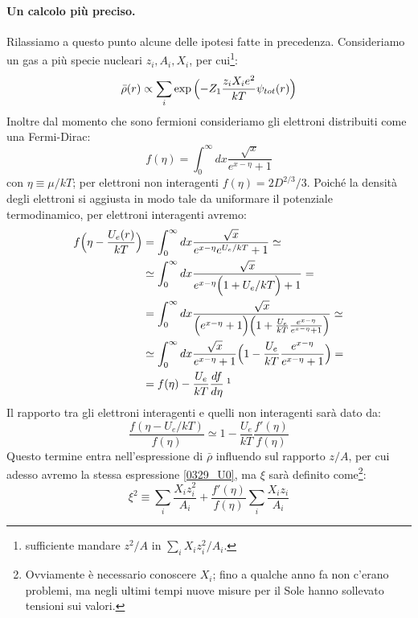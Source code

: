 \paragraph{Un calcolo più preciso.}Rilassiamo a questo punto alcune delle ipotesi fatte in precedenza. Consideriamo un gas a più specie nucleari $z_i, A_i, X_i$, per cui\footnote{ sufficiente mandare $z^2/A$ in $\sum_i X_iz^2_i/A_i$.}:
$$\bar{\rho}(r)\propto \sum_i \exp{\Bigl ( -Z_1 \frac{z_iX_i e^2}{kT}\psi_{tot}(r) \Bigr )}$$
Inoltre dal momento che sono fermioni consideriamo gli elettroni distribuiti come una Fermi-Dirac:
$$f(\eta) = \int_0^\infty dx \frac{\sqrt{x}}{e^{x-\eta}+1}$$
con $\eta \equiv \mu/kT$; per elettroni non interagenti $f(\eta) = 2D^{2/3}/3$. Poiché la densità degli elettroni si aggiusta in modo tale da uniformare il potenziale termodinamico, per elettroni interagenti avremo:
\begin{displaymath}
\begin{aligned}
f\ppc{\eta - \frac{U_e(r)}{kT}} &= \int_0^\infty dx \frac{\sqrt{x}}{e^{x-\eta}e^{U_e/kT}+1} \simeq \\
&\simeq \int_0^\infty dx \frac{\sqrt{x}}{e^{x-\eta}\ppc{1+U_e/kT}+1} =\\
&= \int_0^\infty dx \frac{\sqrt{x}}{\ppc{e^{x-\eta}+1}\ppc{1+\frac{U_e}{kT}\frac{e^{x-\eta}}{e^{x-\eta}+1}}}\simeq \\
&\simeq \int_0^\infty dx \frac{\sqrt{x}}{e^{x-\eta}+1}\ppc{1-\frac{U_e}{kT}\frac{e^{x-\eta}}{e^{x-\eta}+1}} =\\
&= f(\eta) - \frac{U_e}{kT}\frac{df}{d\eta}\:\footnotemark
\end{aligned}
\end{displaymath}
\noindent Il rapporto tra gli elettroni interagenti e quelli non interagenti sarà dato da:
$$\frac{f(\eta-U_e/kT)}{f(\eta)} \simeq 1- \frac{U_e}{kT}\frac{f'(\eta)}{f(\eta)}$$
Questo termine entra nell'espressione di $\bar{\rho}$ influendo sul rapporto $z/A$, per cui adesso avremo la stessa espressione \eqref{0329_U0}, ma $\xi$ sarà definito come\footnote{Ovviamente è necessario conoscere $X_i$; fino a qualche anno fa non c'erano problemi, ma negli ultimi tempi nuove misure per il Sole hanno sollevato tensioni sui valori.}:
$$\xi^2 \equiv \sum_i\frac{X_iz_i^2}{A_i} + \frac{f'(\eta)}{f(\eta)}\sum_i\frac{X_iz_i}{A_i}$$

